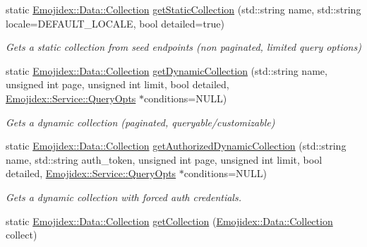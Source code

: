 \begin{DoxyCompactItemize}
\item 
static \hyperlink{classEmojidex_1_1Data_1_1Collection}{Emojidex\+::\+Data\+::\+Collection} \hyperlink{classEmojidex_1_1Service_1_1Collector_a51ed2454051cff8ee1b76dfe0ebd0e3c}{get\+Static\+Collection} (std\+::string name, std\+::string locale=D\+E\+F\+A\+U\+L\+T\+\_\+\+L\+O\+C\+A\+LE, bool detailed=true)\hypertarget{classEmojidex_1_1Service_1_1Collector_a51ed2454051cff8ee1b76dfe0ebd0e3c}{}\label{classEmojidex_1_1Service_1_1Collector_a51ed2454051cff8ee1b76dfe0ebd0e3c}

\begin{DoxyCompactList}\small\item\em Gets a static collection from seed endpoints (non paginated, limited query options) \end{DoxyCompactList}\item 
static \hyperlink{classEmojidex_1_1Data_1_1Collection}{Emojidex\+::\+Data\+::\+Collection} \hyperlink{classEmojidex_1_1Service_1_1Collector_a3d576269475065aef15391dd597dfd5a}{get\+Dynamic\+Collection} (std\+::string name, unsigned int page, unsigned int limit, bool detailed, \hyperlink{classEmojidex_1_1Service_1_1QueryOpts}{Emojidex\+::\+Service\+::\+Query\+Opts} $\ast$conditions=N\+U\+LL)\hypertarget{classEmojidex_1_1Service_1_1Collector_a3d576269475065aef15391dd597dfd5a}{}\label{classEmojidex_1_1Service_1_1Collector_a3d576269475065aef15391dd597dfd5a}

\begin{DoxyCompactList}\small\item\em Gets a dynamic collection (paginated, queryable/customizable) \end{DoxyCompactList}\item 
static \hyperlink{classEmojidex_1_1Data_1_1Collection}{Emojidex\+::\+Data\+::\+Collection} \hyperlink{classEmojidex_1_1Service_1_1Collector_a4d3839fcce3e4191b3076c64bab9a925}{get\+Authorized\+Dynamic\+Collection} (std\+::string name, std\+::string auth\+\_\+token, unsigned int page, unsigned int limit, bool detailed, \hyperlink{classEmojidex_1_1Service_1_1QueryOpts}{Emojidex\+::\+Service\+::\+Query\+Opts} $\ast$conditions=N\+U\+LL)\hypertarget{classEmojidex_1_1Service_1_1Collector_a4d3839fcce3e4191b3076c64bab9a925}{}\label{classEmojidex_1_1Service_1_1Collector_a4d3839fcce3e4191b3076c64bab9a925}

\begin{DoxyCompactList}\small\item\em Gets a dynamic collection with forced auth credentials. \end{DoxyCompactList}\item 
static \hyperlink{classEmojidex_1_1Data_1_1Collection}{Emojidex\+::\+Data\+::\+Collection} \hyperlink{classEmojidex_1_1Service_1_1Collector_afeb2efb1c30de239a89f360eba795818}{get\+Collection} (\hyperlink{classEmojidex_1_1Data_1_1Collection}{Emojidex\+::\+Data\+::\+Collection} collect)\hypertarget{classEmojidex_1_1Service_1_1Collector_afeb2efb1c30de239a89f360eba795818}{}\label{classEmojidex_1_1Service_1_1Collector_afeb2efb1c30de239a89f360eba795818}


\end{DoxyCompactItemize}

